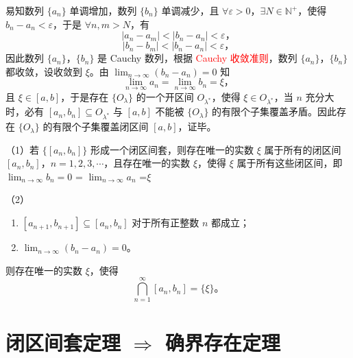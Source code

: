 \documentclass[lang=cn,newtx,10pt,scheme=chinese]{elegantbook}
\begin{document}
易知数列 $\{a_n\}$ 单调增加，数列 $\{b_n\}$ 单调减少，且 $\forall \varepsilon > 0$，$\exists N \in \mathbb{N}^+$，使得 $b_n - a_n < \varepsilon$，于是 $\forall n, m > N$，有
\[
|a_n - a_m| < |b_n - a_n| < \varepsilon，
\]
\[
|b_n - b_m| < |b_n - a_n| < \varepsilon，
\]
因此数列 $\{a_n\}$，$\{b_n\}$ 是 Cauchy 数列，根据 \textcolor{red}{Cauchy 收敛准则}，数列 $\{a_n\}$，$\{b_n\}$ 都收敛，设收敛到 $\xi$。由 $\lim_{n \to \infty} (b_n - a_n) = 0$ 知
\[
\lim_{n \to \infty} a_n = \lim_{n \to \infty} b_n = \xi，
\]
且 $\xi \in [a, b]$，于是存在 $\{O_{\lambda}\}$ 的一个开区间 $O_{\lambda^*}$，使得 $\xi \in O_{\lambda^*}$，当 $n$ 充分大时，必有 $[a_n, b_n] \subseteq O_{\lambda^*}$ 与 $[a, b]$ 不能被 $\{O_{\lambda}\}$ 的有限个子集覆盖矛盾。因此存在 $\{O_{\lambda}\}$ 的有限个子集覆盖闭区间 $[a, b]$，证毕。



\begin{theorem}[ 闭区间套定理] \label{property:cauchy3}
（1）若 \(\{[a_n, b_n]\}\) 形成一个闭区间套，则存在唯一的实数 \(\xi\) 属于所有的闭区间 \([a_n, b_n]\)，\(n = 1, 2, 3, \cdots\)，且存在唯一的实数 \( \xi \)，使得 \( \xi \) 属于所有这些闭区间，即  \( \lim_{n \to \infty} b_n = 0 \) = \( \lim_{n \to \infty} a_n   \) =\( \xi \) 

（2）\begin{enumerate}
    \item $[a_{n+1}, b_{n+1}] \subseteq [a_n, b_n]$ 对于所有正整数 $n$ 都成立；
    \item $\lim_{n \to \infty} (b_n - a_n) = 0$。
\end{enumerate}
则存在唯一的实数 $\xi$，使得
\[
\bigcap_{n=1}^{\infty} [a_n, b_n] = \{\xi\}。
\]
\end{theorem}


\section*{闭区间套定理 $\Rightarrow$ 确界存在定理}
\end{document}
